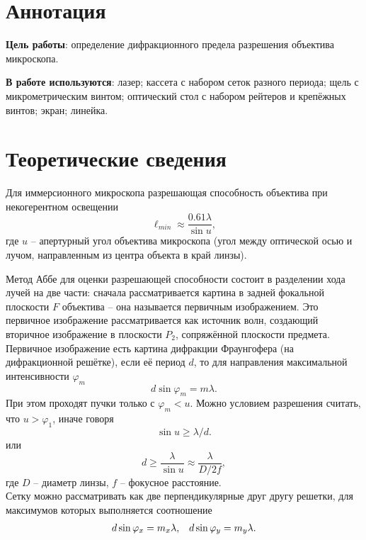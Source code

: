 






\section{Аннотация}

\textbf{Цель работы}: определение дифракционного предела разрешения объектива микроскопа.

\textbf{В работе используются}: лазер; кассета с набором сеток разного периода; щель с микрометрическим винтом; оптический стол с набором рейтеров и крепёжных винтов; экран; линейка.


\section{Теоретические сведения}
Для иммерсионного микроскопа разрешающая способность объектива при некогерентном освещении
\begin{equation}
\ell_{min} \approx \dfrac{0.61\lambda}{\sin u},
\end{equation}
где $u$ -- апертурный угол объектива микроскопа (угол между оптической осью и лучом, направленным из центра объекта в край линзы).

Метод Аббе для оценки разрешающей способности состоит в разделении хода лучей на две части: сначала рассматривается картина в задней фокальной плоскости $F$ объектива -- она называется первичным изображением. Это первичное изображение рассматривается как источник волн, создающий вторичное изображение в плоскости $P_2$, сопряжённой плоскости предмета.\\
Первичное изображение есть картина дифракции Фраунгофера (на дифракционной решётке), если её период $d$, то для направления максимальной интенсивности $\varphi_m$
\begin{equation}
d \sin \varphi_m = m\lambda.
\end{equation}
При этом проходят пучки только с $\varphi_m < u$. Можно условием разрешения считать, что $u > \varphi_1$, иначе говоря
$$
\sin u \geq \lambda/d.
$$
или
\begin{equation}
\label{equ:allow}
d \geq \dfrac{\lambda}{\sin u} \approx \dfrac{\lambda}{D/2f},
\end{equation}
где $D$ -- диаметр линзы, $f$ -- фокусное расстояние.\\
Сетку можно рассматривать как две перпендикулярные друг другу решетки, для максимумов которых выполняется соотношение
\begin{equation}
\begin{array}{c c}
d\sin \varphi_x = m_x \lambda, & d\sin \varphi_y = m_y \lambda. \\
\end{array}
\end{equation}
\newpage
